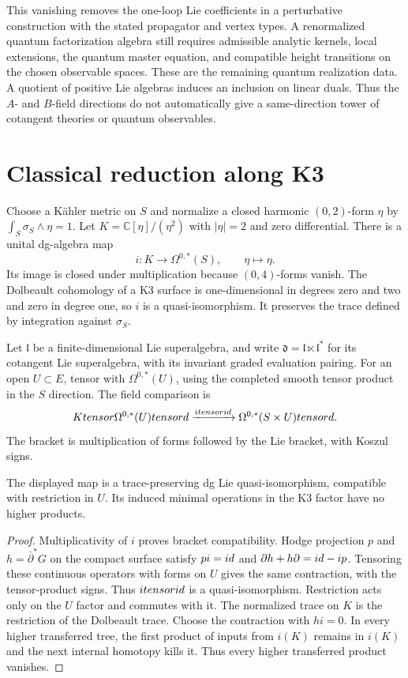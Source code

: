This vanishing removes the one-loop Lie coefficients in a perturbative
construction with the stated propagator and vertex types.
A renormalized quantum factorization algebra still requires admissible
analytic kernels, local extensions, the quantum master equation, and
compatible height transitions on the chosen observable spaces.
These are the remaining quantum realization data. A quotient of
positive Lie algebras induces an inclusion on linear duals. Thus the
$A$- and $B$-field directions do not automatically give a same-direction
tower of cotangent theories or quantum observables.

\section{Classical reduction along K3}
Choose a K\"ahler metric on $S$ and normalize a closed harmonic
$(0,2)$-form $\eta$ by $\int_S\sigma_S\wedge\eta=1$.
Let $K=\mathbb C[\eta]/(\eta^2)$ with $|\eta|=2$ and zero differential.
There is a unital dg-algebra map
\[
 i:K\longrightarrow\Omega^{0,*}(S),\qquad \eta\longmapsto\eta.
\]
Its image is closed under multiplication because $(0,4)$-forms vanish.
The Dolbeault cohomology of a K3 surface is one-dimensional in degrees
zero and two and zero in degree one, so $i$ is a quasi-isomorphism.
It preserves the trace defined by integration against $\sigma_S$.

Let $\mathfrak l$ be a finite-dimensional Lie superalgebra, and write
$\mathfrak d=\mathfrak l\ltimes\mathfrak l^*$ for its cotangent Lie
superalgebra, with its invariant graded evaluation pairing.
For an open $U\subset E$, tensor with $\Omega^{0,*}(U)$, using the
completed smooth tensor product in the $S$ direction.
The field comparison is
\[
 Ktensor\Omega^{0,*}(U)tensord
 \xrightarrow{itensorid}
 \Omega^{0,*}(S\times U)tensord.
\]
The bracket is multiplication of forms followed by the Lie bracket,
with Koszul signs.

\begin{proposition}\label{cyiv:k3-classical-reduction}
The displayed map is a trace-preserving dg Lie quasi-isomorphism,
compatible with restriction in $U$.
Its induced minimal operations in the K3 factor have no higher products.
\end{proposition}
\begin{proof}
Multiplicativity of $i$ proves bracket compatibility.
Hodge projection $p$ and $h=\bar\partial^*G$ on the compact surface satisfy
$pi=id$ and $\partial h+h\partial=id-ip$.
Tensoring these continuous operators with forms on $U$ gives the same
contraction, with the tensor-product signs.
Thus $itensorid$ is a quasi-isomorphism.
Restriction acts only on the $U$ factor and commutes with it.
The normalized trace on $K$ is the restriction of the Dolbeault trace.
Choose the contraction with $hi=0$.
In every higher transferred tree, the first product of inputs from
$i(K)$ remains in $i(K)$ and the next internal homotopy kills it.
Thus every higher transferred product vanishes.
\end{proof}

